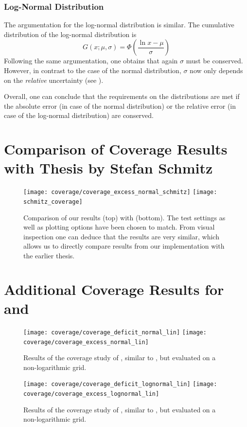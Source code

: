 \subsubsection{Log-Normal Distribution}

The argumentation for the log-normal distribution is similar. The cumulative distribution of the log-normal distribution is 
\begin{equation}
    G(x; \mu, \sigma) = \Phi\left(\frac{\ln x - \mu}{\sigma}\right)
\end{equation}
Following the same argumentation, one obtains that again $\sigma$ must be conserved. However, in contrast to the case of the normal distribution, $\sigma$ now only depends on the \emph{relative} uncertainty (see ).

Overall, one can conclude that the requirements on the distributions are met if the absolute error (in case of the normal distribution) or the relative error (in case of the log-normal distribution) are conserved.

\newpage
\section{Comparison of Coverage Results with Thesis by Stefan Schmitz}
\label{app:coverage_schmitz}

\begin{figure}
    \centering
    \texttt{[image: coverage/coverage\_excess\_normal\_schmitz]}
    \texttt{[image: schmitz\_coverage]}
    \caption{Comparison of our results (top) with \cite{Schmitz:ModelUnspecificSearch} (bottom). The test settings as well as plotting options have been chosen to match. From visual inspection one can deduce that the results are very similar, which allows us to directly compare results from our implementation with the earlier thesis.}
    \label{fig:coverage_schmitz}
\end{figure}

\newpage
\section{Additional Coverage Results for \TS and \TSprime}
\label{app:coverage_additional_results}

\begin{figure}
    \centering
    \texttt{[image: coverage/coverage\_deficit\_normal\_lin]}
    \texttt{[image: coverage/coverage\_excess\_normal\_lin]}
    \caption{Results of the coverage study of \TS, similar to , but evaluated on a non-logarithmic grid.}
\end{figure}

\begin{figure}
    \centering
    \texttt{[image: coverage/coverage\_deficit\_lognormal\_lin]}
    \texttt{[image: coverage/coverage\_excess\_lognormal\_lin]}
    \caption{Results of the coverage study of \TSprime, similar to , but evaluated on a non-logarithmic grid.}
\end{figure}